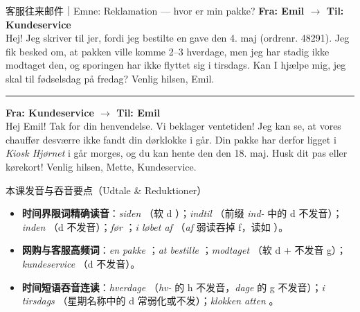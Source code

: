 \begin{emailbox}{客服往来邮件｜Emne: Reklamation --- hvor er min pakke?}
\textbf{Fra: Emil \quad $\rightarrow$ \quad Til: Kundeservice}\\
Hej! Jeg skriver til jer, fordi jeg bestilte en gave den 4. maj (ordrenr. 48291). Jeg fik besked om, at pakken ville komme  2--3 hverdage, men jeg har stadig ikke modtaget den, og sporingen har ikke flyttet sig  i tirsdags. Kan I hjælpe mig,  jeg skal til fødselsdag på fredag? Venlig hilsen, Emil.

\vspace{0.4em}
\hrule
\vspace{0.4em}

\textbf{Fra: Kundeservice \quad $\rightarrow$ \quad Til: Emil}\\
Hej Emil! Tak for din henvendelse. Vi beklager ventetiden! Jeg kan se, at vores chauffør desværre ikke fandt din dørklokke i går. Din pakke har derfor ligget i \textit{Kiosk Hjørnet}  i går morges, og du kan hente den  den 18. maj. Husk dit pas eller kørekort! Venlig hilsen, Mette, Kundeservice.
\end{emailbox}

\begin{tipbox}{本课发音与吞音要点（Udtale \& Reduktioner）}
\begin{itemize}
  \item \textbf{时间界限词精确读音}：\textit{siden} （软 d ）；\textit{indtil} （前缀 \textit{ind-} 中的 d 不发音）；\textit{inden} （d 不发音）；\textit{før} ；\textit{i løbet af} （\textit{af} 弱读吞掉 f，读如 ）。
  \item \textbf{网购与客服高频词}：\textit{en pakke} ；\textit{at bestille} ；\textit{modtaget} （软 d + 不发音 g）；\textit{kundeservice} （d 不发音）。
  \item \textbf{时间短语吞音连读}：\textit{hverdage} （\textit{hv-} 的 h 不发音，\textit{dage} 的 g 不发音）；\textit{i tirsdags} （星期名称中的 d 常弱化或不发）；\textit{klokken atten} 。
\end{itemize}
\end{tipbox}


